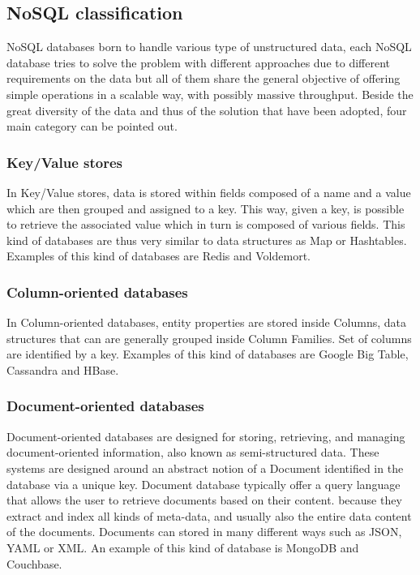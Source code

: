 \subsection{NoSQL classification}
NoSQL databases born to handle various type of unstructured data, each NoSQL database tries to solve the problem with different approaches due to different requirements on the data but all of them share the general objective of offering simple operations in a scalable way, with possibly massive throughput.
Beside the great diversity of the data and thus of the solution that have been adopted, four main category can be pointed out.

\subsubsection{Key/Value stores} 
In Key/Value stores, data is stored within fields composed of a name and a value which are then grouped and assigned to a key. This way, given a key, is possible to retrieve the associated value which in turn is composed of various fields. This kind of databases are thus very similar to data structures as Map or Hashtables.
Examples of this kind of databases are Redis and Voldemort.

\subsubsection{Column-oriented databases}
In Column-oriented databases, entity properties are stored inside Columns, data structures that can are generally grouped inside Column Families.
Set of columns are identified by a key.
Examples of this kind of databases are Google Big Table, Cassandra and HBase.

\subsubsection{Document-oriented databases}
Document-oriented databases are designed for storing, retrieving, and managing document-oriented information, also known as semi-structured data. 
These systems are designed around an abstract notion of a Document identified in the database via a unique key. 
Document database typically offer a query language that allows the user to retrieve documents based on their content. because they extract and index all kinds of meta-data, and usually also the entire data content of the documents. 
Documents can stored  in many different ways such as JSON, YAML or XML.
An example of this kind of database is MongoDB and Couchbase.


